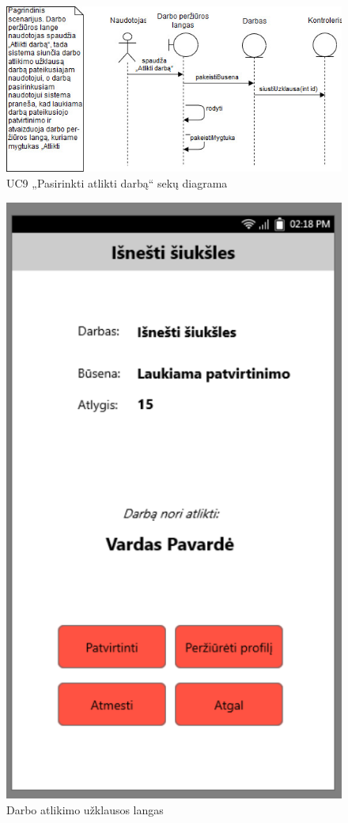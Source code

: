 \documentclass{VUMIFPSbakalaurinis}
\begin{document}
\begin{figure}[H]
	\centering
	\includegraphics[scale=0.6]{img/Sequence/9sequence}
	\caption{UC9 „Pasirinkti atlikti darbą“ sekų diagrama}
	\label{img:uc9seq}
\end{figure}

\begin{figure}[H]
	\centering
	\includegraphics[scale=0.4]{img/ScreenShots/2}
	\caption{Darbo atlikimo užklausos langas}
	\label{img:selected job 2}
\end{figure}
\end{document}

